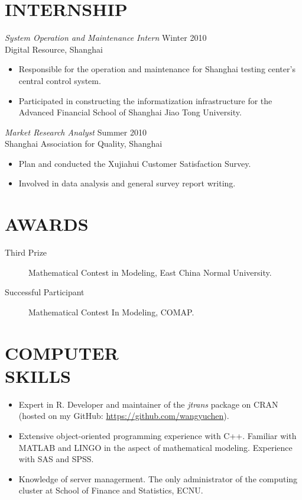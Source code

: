 \documentclass[margin]{res}
\begin{document}
\begin{resume}
		\section{INTERNSHIP} 
		{\sl System Operation and Maintenance Intern} \hfill Winter 2010 \\
		Digital Resource, Shanghai
		\begin{itemize}  \itemsep -2pt %
			\item Responsible for the operation and maintenance for Shanghai testing center's central control system.
			\item Participated in constructing the informatization infrastructure for the Advanced Financial School of Shanghai Jiao Tong University.
		\end{itemize} 
		
		{\sl Market Research Analyst} \hfill Summer 2010 \\
        Shanghai Association for Quality, Shanghai
        \begin{itemize}  \itemsep -2pt %
			\item Plan and conducted the Xujiahui Customer Satisfaction Survey.
        	\item Involved in data analysis and general survey report writing.
        \end{itemize}
		
		\section{AWARDS}
		\begin{description}
		  \item[Third Prize] Mathematical Contest in Modeling, East China Normal University.
		  \item[Successful Participant] Mathematical Contest In Modeling, COMAP.
		\end{description} 
		
		\section{COMPUTER \\ SKILLS}
		\begin{itemize}  \itemsep -2pt %
			\item Expert in R. Developer and maintainer of the \emph{jtrans} package on CRAN (hosted on my GitHub: \url{https://github.com/wangyuchen}). 
			\item Extensive object-oriented programming experience with C++. Familiar with MATLAB and LINGO in the aspect of mathematical modeling. Experience with SAS and SPSS. 
			\item Knowledge of server managerment. The only administrator of the computing cluster at School of Finance and Statistics, ECNU. 
		\end{itemize}
		
	\end{resume}
\end{document}
